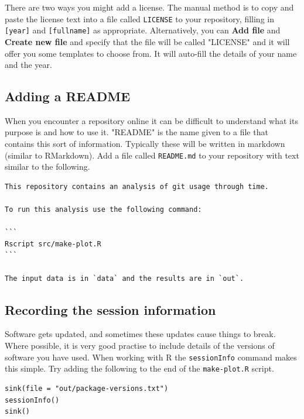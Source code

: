 \documentclass[11pt,onecolumn]{scrartcl}
\begin{document}
There are two ways you might add a license. The manual method is to copy and
paste the license text into a file called \texttt{LICENSE} to your repository, filling in
\texttt{[year]} and \texttt{[fullname]} as appropriate. Alternatively, you can \textbf{Add file} and \textbf{Create
new file} and specify that the file will be called "LICENSE" and it will offer
you some templates to choose from. It will auto-fill the details of your name
and the year.

\subsection{Adding a README}
\label{sec:org1256f52}

When you encounter a repository online it can be difficult to understand what
its purpose is and how to use it. "README" is the name given to a file that
contains this sort of information. Typically these will be written in markdown
(similar to RMarkdown). Add a file called \texttt{README.md} to your repository with text
similar to the following.

\lstset{language=sh,label= ,caption= ,captionpos=b,numbers=none}
\begin{lstlisting}
This repository contains an analysis of git usage through time.

To run this analysis use the following command:

```
Rscript src/make-plot.R
```

The input data is in `data` and the results are in `out`.
\end{lstlisting}

\subsection{Recording the session information}
\label{sec:orgab3fce7}

Software gets updated, and sometimes these updates cause things to break. Where
possible, it is very good practise to include details of the versions of
software you have used. When working with R the \texttt{sessionInfo} command makes this
simple. Try adding the following to the end of the \texttt{make-plot.R} script.

\lstset{language=r,label= ,caption= ,captionpos=b,numbers=none}
\begin{lstlisting}
sink(file = "out/package-versions.txt")
sessionInfo()
sink()
\end{lstlisting}
\end{document}
